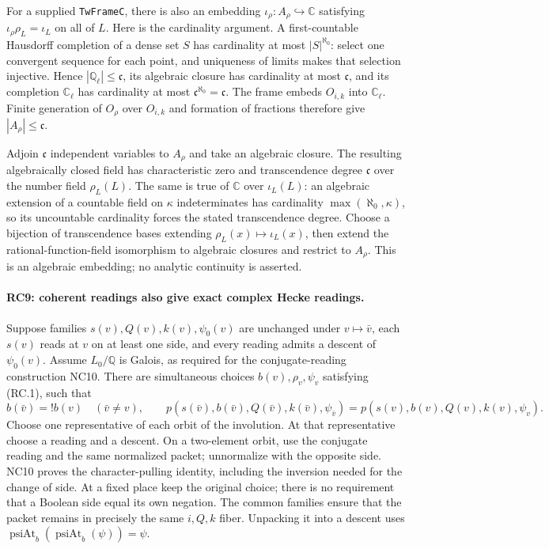 For a supplied \texttt{TwFrameC}, there is also an embedding
$\iota_\rho:A_\rho\hookrightarrow\mathbb C$ satisfying
$\iota_\rho\rho_L=\iota_L$ on all of $L$.
Here is the cardinality argument. A first-countable Hausdorff completion
of a dense set $S$ has cardinality at most $|S|^{\aleph_0}$: select one
convergent sequence for each point, and uniqueness of limits makes that
selection injective. Hence $|\mathbb Q_\ell|\le\mathfrak c$,
its algebraic closure has cardinality at most $\mathfrak c$, and its
completion $\mathbb C_\ell$ has cardinality at most
$\mathfrak c^{\aleph_0}=\mathfrak c$. The frame embeds $O_{i,k}$ into
$\mathbb C_\ell$. Finite generation of $O_\rho$ over $O_{i,k}$ and
formation of fractions therefore give $|A_\rho|\le\mathfrak c$.

Adjoin $\mathfrak c$ independent variables to $A_\rho$ and take an
algebraic closure. The resulting algebraically closed field has
characteristic zero and transcendence degree $\mathfrak c$ over the
number field $\rho_L(L)$. The same is true of $\mathbb C$ over
$\iota_L(L)$: an algebraic extension of a countable field on $\kappa$
indeterminates has cardinality $\max(\aleph_0,\kappa)$, so its
uncountable cardinality forces the stated transcendence degree.
Choose a bijection of transcendence bases extending
$\rho_L(x)\mapsto\iota_L(x)$, then extend the rational-function-field
isomorphism to algebraic closures and restrict to $A_\rho$.
This is an algebraic embedding; no analytic continuity is asserted.

\paragraph{RC9: coherent readings also give exact complex Hecke readings.}
Suppose families $s(v),Q(v),k(v),\psi_0(v)$ are unchanged under
$v\mapsto\bar v$, each $s(v)$ reads at $v$ on at least one side, and
every reading admits a descent of $\psi_0(v)$.
Assume $L_0/\mathbb Q$ is Galois, as required for the conjugate-reading
construction NC10. There are simultaneous choices
$b(v),\rho_v,\psi_v$ satisfying (RC.1), such that
\[
 b(\bar v)=!b(v)\quad(\bar v\ne v),\qquad
 p(s(\bar v),b(\bar v),Q(\bar v),k(\bar v),\psi_{\bar v})
 =p(s(v),b(v),Q(v),k(v),\psi_v).                          \tag{RC.9}
\]
Choose one representative of each orbit of the involution. At that
representative choose a reading and a descent. On a two-element orbit,
use the conjugate reading and the same normalized packet; unnormalize
with the opposite side. NC10 proves the character-pulling identity,
including the inversion needed for the change of side.
At a fixed place keep the original choice; there is no requirement
that a Boolean side equal its own negation. The common families ensure
that the packet remains in precisely the same $i,Q,k$ fiber.
Unpacking it into a descent uses $\operatorname{psiAt}_b(\operatorname{psiAt}_b(\psi))=\psi$.

